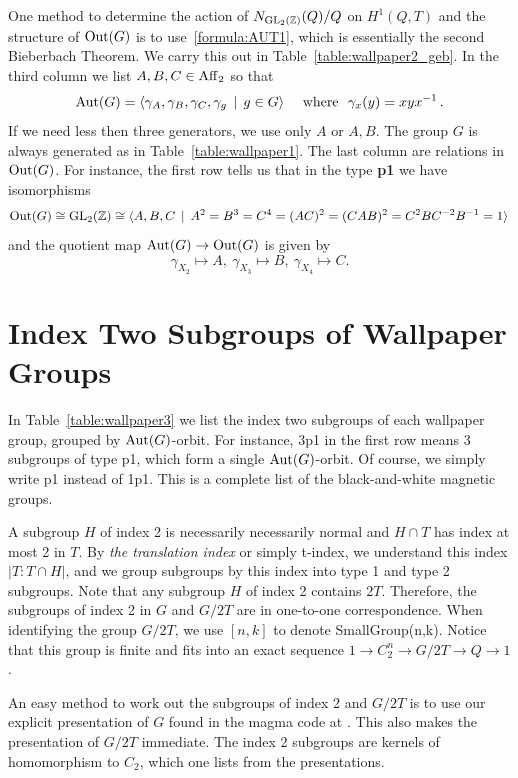 One method to determine the action of $N_{\operatorname{GL}_2 ({\mathbb Z}) }(Q)/Q$ on $H^1(Q,T)$ and the structure of $\operatorname{Out} (G)$ is to use~\eqref{formula:AUT1},
which is essentially the second Bieberbach Theorem. We carry this out in Table~\ref{table:wallpaper2_geb}. In the third column we list
$A,B,C \in \operatorname{Aff}_2$ so that
\[ \operatorname{Aut} (G) = \langle \gamma_A,\gamma_B,\gamma_C,\gamma_g \,\mid\, g\in G \rangle \quad \mbox{ where } \
\gamma_x (y) = xyx^{-1} \, .\]
If we need less then three generators, we use only $A$ or $A,B$. The group $G$ is always generated as in Table~\ref{table:wallpaper1}.
The last column are relations in $\operatorname{Out} (G)$. For instance,
the first row tells us that in the type {\bfseries p1} we have isomorphisms
\[
\operatorname{Out}(G) \cong \operatorname{GL}_2 ({\mathbb Z}) \cong \langle A,B,C \, \mid \, A^2 = B^3 = C^4 = (AC)^2= (CAB)^2 = C^2BC^{-2}B^{-1} = 1 \rangle \,
\]
and the quotient map $\operatorname{Aut} (G) \to \operatorname{Out} (G)$ is given by
\[ \gamma_{X_2} \mapsto A, \
\gamma_{X_3} \mapsto B, \
\gamma_{X_4} \mapsto C. \] 

\section{Index Two Subgroups of Wallpaper Groups}

In Table~\ref{table:wallpaper3} we list the index two subgroups of each wallpaper group, grouped by $\operatorname{Aut} (G)$-orbit.
For instance, 3p1 in the first row means 3 subgroups of type p1, which form a single $\operatorname{Aut}(G)$-orbit.
Of course, we simply write p1 instead of 1p1. This is a complete list of the black-and-white magnetic groups.

A subgroup $H$ of index 2 is necessarily necessarily normal and $H\cap T$ has index at most 2 in $T$.
By {\em the translation index} or simply t-index, we understand this index $|T:T\cap H|$, and we group subgroups by this index into type 1 and type 2 subgroups. Note that any subgroup $H$ of index 2 contains $2T$. Therefore, the subgroups of index 2 in $G$ and $G/2T$ are in one-to-one correspondence. When identifying the group $G / 2T$, we use $[n,k]$ to denote SmallGroup(n,k).
Notice that this group is finite and fits into an exact sequence $1\to C_2^n \to G/2T \to Q \to 1$.

An easy method to work out the subgroups of index 2 and $G/2T$ is to use our explicit presentation of $G$ found in the magma code at \cite{GITHUB}. This also makes the presentation of $G/2T$ immediate. The index 2 subgroups are kernels of homomorphism to $C_2$, which one lists from the presentations.

